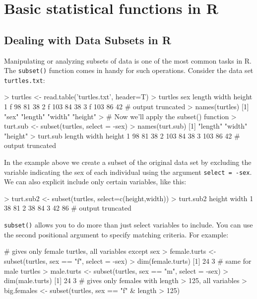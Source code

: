 
\section{Basic statistical functions in R}

\subsection{Dealing with Data Subsets in R}

Manipulating or analyzing subsets of data is one of the most common
tasks in R. The \lstinline!subset()! function comes in handy for such
operations. Consider the data set \lstinline!turtles.txt!:
%
\begin{R}
> turtles <- read.table('turtles.txt', header=T)
> turtles
   sex length width height
1    f     98    81     38
2    f    103    84     38
3    f    103    86     42
  # output truncated
> names(turtles)
[1] "sex"    "length" "width"  "height"
> # Now we'll apply the subset() function
> turt.sub <- subset(turtles, select = -sex)
> names(turt.sub)
[1] "length" "width"  "height"
> turt.sub
   length width height
1      98    81     38
2     103    84     38
3     103    86     42
  # output truncated
\end{R}
%
In the example above we create a subset of the original data set by
excluding the variable indicating the sex of each individual using the
argument \lstinline!select = -sex!. We can also explicit include only
certain variables, like this:
%
\begin{R}
> turt.sub2 <- subset(turtles, select=c(height,width))
> turt.sub2
   height width
1      38    81
2      38    84
3      42    86
  # output truncated    
\end{R}
%
\lstinline!subset()! allows you to do more than just select variables to
include. You can use the second positional argument to specify matching
criteria. For example:
%
\begin{R}
# gives only female turtles, all variables except sex
> female.turts <- subset(turtles, sex == "f", select = -sex)
> dim(female.turts)
[1] 24  3
# same for male turtles
> male.turts <- subset(turtles, sex == "m", select = -sex)
> dim(male.turts)
[1] 24  3
# gives only females with length > 125, all variables
> big.females <- subset(turtles, sex == "f" & length > 125)    
\end{R}

